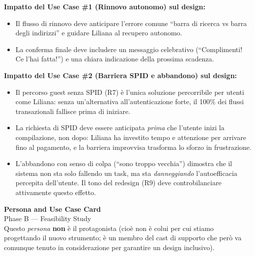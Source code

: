 \documentclass[11pt,a4paper]{article}
\begin{document}
\begin{tcolorbox}[colback=backgroundColor,colframe=borderColor,arc=2mm]
    {\small
    \textbf{Impatto del Use Case \#1 (Rinnovo autonomo) sul design:} \\[4pt]
    \begin{itemize}[leftmargin=*]
        \item Il flusso di rinnovo deve anticipare l'errore comune ``barra di ricerca vs barra degli indirizzi'' e guidare Liliana al recupero autonomo.
        \item La conferma finale deve includere un messaggio celebrativo (``Complimenti! Ce l'hai fatta!'') e una chiara indicazione della prossima scadenza.
    \end{itemize}
    \vspace{0.2cm}
    \textbf{Impatto del Use Case \#2 (Barriera SPID e abbandono) sul design:} \\[4pt]
    \begin{itemize}[leftmargin=*]
        \item Il percorso guest senza SPID (R7) \`e l'unica soluzione percorribile per utenti come Liliana: senza un'alternativa all'autenticazione forte, il 100\% dei flussi transazionali fallisce prima di iniziare.
        \item La richiesta di SPID deve essere anticipata \textit{prima} che l'utente inizi la compilazione, non dopo: Liliana ha investito tempo e attenzione per arrivare fino al pagamento, e la barriera improvvisa trasforma lo sforzo in frustrazione.
        \item L'abbandono con senso di colpa (``sono troppo vecchia'') dimostra che il sistema non sta solo fallendo un task, ma sta \textit{danneggiando} l'autoefficacia percepita dell'utente. Il tono del redesign (R9) deve controbilanciare attivamente questo effetto.
    \end{itemize}
    }
\end{tcolorbox}

\vspace{0.5cm}


\begin{center}
    {\color{primaryColor}\Large\bfseries Persona and Use Case Card} \\[4pt]
    {\color{secondaryColor}\normalsize Phase B --- Feasibility Study} \\[4pt]
    {\color{secondaryColor}\small Questo \textit{persona} \textbf{non} \`e il protagonista (cio\`e non \`e colui per cui stiamo progettando il nuovo strumento; \`e un membro del cast di supporto che per\`o va comunque tenuto in considerazione per garantire un design inclusivo).}
\end{center}
\end{document}
